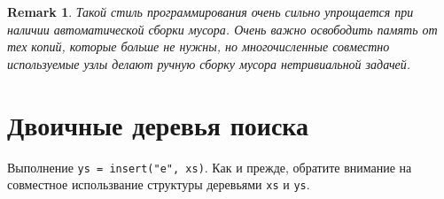 \documentclass[aspectratio=169
  , xcolor={svgnames}
  , hyperref={ colorlinks,citecolor=DeepPink4
             , linkcolor=DarkRed,urlcolor=DarkBlue}
  , russian
  ]{beamer}
\newtheorem*{remark}{Remark}
\begin{document}
\begin{frame}
\begin{remark}
	Такой стиль программирования очень сильно упрощается при наличии
	автоматической сборки мусора. Очень важно освободить память от тех
	копий, которые больше не нужны, но многочисленные совместно используемые
	узлы делают ручную сборку мусора нетривиальной задачей.
\end{remark}
\end{frame}

\section{Двоичные деревья поиска}

\begin{frame}[fragile]{}
\begin{minipage}{.48\textwidth}
		\par
\end{minipage}
\begin{minipage}{.48\textwidth}
	
\end{minipage}
Выполнение \texttt{ys = insert("e", xs)}. Как и прежде,
обратите внимание на совместное использвание структуры деревьями \texttt{xs} и \texttt{ys}.
\end{frame}


% 
\end{document}
